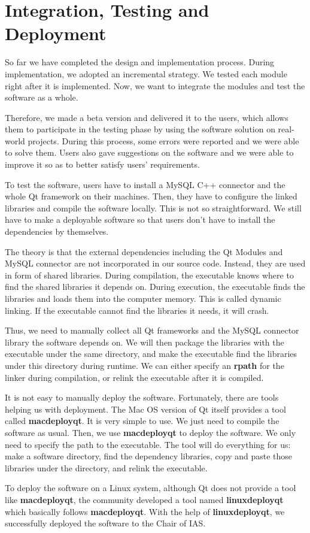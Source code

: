 \chapter{Integration, Testing and Deployment}
So far we have completed the design and implementation process. During implementation, we adopted an incremental strategy. We tested each module right after it is implemented. Now, we want to integrate the modules and test the software as a whole.

Therefore, we made a beta version and delivered it to the users, which allows them to participate in the testing phase by using the software solution on real-world projects. During this process, some errors were reported and we were able to solve them. Users also gave suggestions on the software and we were able to improve it so as to better satisfy users' requirements. 

To test the software, users have to install a MySQL C++ connector and the whole Qt framework on their machines. Then, they have to configure the linked libraries and compile the software locally. This is not so straightforward. We still have to make a deployable software so that users don't have to install the dependencies by themselves.

The theory is that the external dependencies including the Qt Modules and MySQL connector are not incorporated in our source code. Instead, they are used in form of shared libraries. During compilation, the executable knows where to find the shared libraries it depends on. During execution, the executable finds the libraries and loads them into the computer memory. This is called dynamic linking. If the executable cannot find the libraries it needs, it will crash.

Thus, we need to manually collect all Qt frameworks and the MySQL connector library the software depends on. We will then package the libraries with the executable under the same directory, and make the executable find the libraries under this directory during runtime. We can either specify an \textbf{rpath} for the linker during compilation, or relink the executable after it is compiled.

It is not easy to manually deploy the software. Fortunately, there are tools helping us with deployment. The Mac OS version of Qt itself provides a tool called \textbf{macdeployqt}. It is very simple to use. We just need to compile the software as usual. Then, we use \textbf{macdeployqt} to deploy the software. We only need to specify the path to the executable. The tool will do everything for us: make a software directory, find the dependency libraries, copy and paste those libraries under the directory, and relink the executable.

To deploy the software on a Linux system, although Qt does not provide a tool like \textbf{macdeployqt}, the community developed a tool named \textbf{linuxdeployqt} \cite{linuxdeployqt} which basically follows \textbf{macdeployqt}. With the help of \textbf{linuxdeployqt}, we successfully deployed the software to the Chair of IAS.
